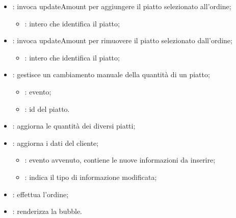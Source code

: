 \begin{itemize}
	\item {}: invoca updateAmount per aggiungere il piatto selezionato all'ordine;
		\begin{itemize}
			\item {}: intero che identifica il piatto;
		\end{itemize}
	\item {}: invoca updateAmount per rimuovere il piatto selezionato dall'ordine;
		\begin{itemize}
			\item {}: intero che identifica il piatto;
		\end{itemize}
	\item {}: gestisce un cambiamento manuale della quantità di un piatto;
		\begin{itemize}
			\item {}: evento;
			\item {}: id del piatto.
		\end{itemize}
	\item {}: aggiorna le quantità dei diversi piatti;
	\item {}: aggiorna i dati del cliente;
		\begin{itemize}
			\item {}: evento avvenuto, contiene le nuove informazioni da inserire;
			\item {}: indica il tipo di informazione modificata;
		\end{itemize}
	\item {}: effettua l'ordine;
	\item {}: renderizza la bubble.
\end{itemize}

